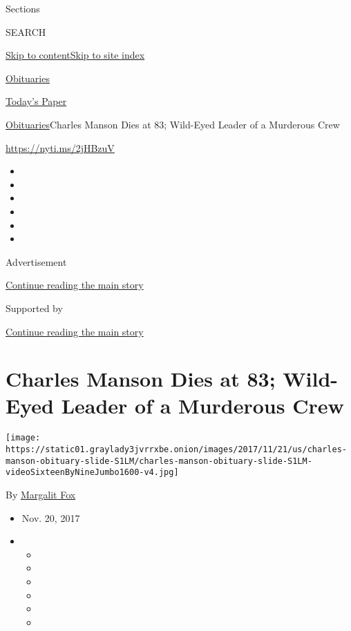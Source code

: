 Sections

SEARCH

\protect\hyperlink{site-content}{Skip to
content}\protect\hyperlink{site-index}{Skip to site index}

\href{https://www.nytimes3xbfgragh.onion/section/obituaries}{Obituaries}

\href{https://myaccount.nytimes3xbfgragh.onion/auth/login?response_type=cookie\&client_id=vi}{}

\href{https://www.nytimes3xbfgragh.onion/section/todayspaper}{Today's
Paper}

\href{/section/obituaries}{Obituaries}\textbar{}Charles Manson Dies at
83; Wild-Eyed Leader of a Murderous Crew

\url{https://nyti.ms/2jHBzuV}

\begin{itemize}
\item
\item
\item
\item
\item
\item
\end{itemize}

Advertisement

\protect\hyperlink{after-top}{Continue reading the main story}

Supported by

\protect\hyperlink{after-sponsor}{Continue reading the main story}

\hypertarget{charles-manson-dies-at-83-wild-eyed-leader-of-a-murderous-crew}{%
\section{Charles Manson Dies at 83; Wild-Eyed Leader of a Murderous
Crew}\label{charles-manson-dies-at-83-wild-eyed-leader-of-a-murderous-crew}}

\texttt{[image: https://static01.graylady3jvrrxbe.onion/images/2017/11/21/us/charles-manson-obituary-slide-S1LM/charles-manson-obituary-slide-S1LM-videoSixteenByNineJumbo1600-v4.jpg]}

By \href{http://www.nytimes3xbfgragh.onion/by/margalit-fox}{Margalit
Fox}

\begin{itemize}
\item
  Nov. 20, 2017
\item
  \begin{itemize}
  \item
  \item
  \item
  \item
  \item
  \item
  \end{itemize}
\end{itemize}

